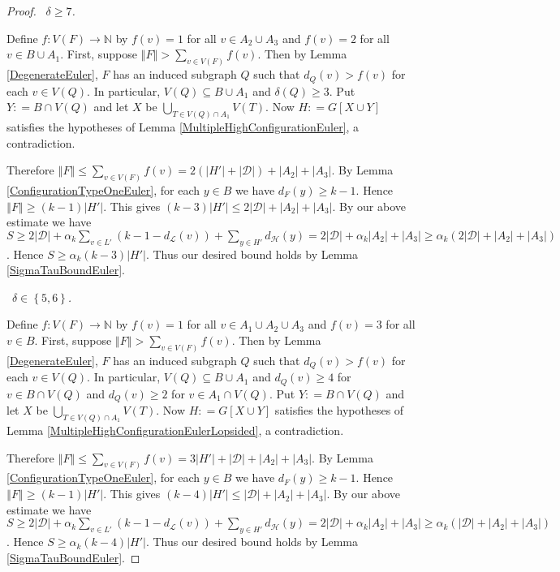 \documentclass[12pt]{article}
\theoremstyle{plain}
\theoremstyle{definition}
\theoremstyle{remark}
\newcommand{\fancy}[1]{\mathcal{#1}}
\newcommand{\IN}{\mathbb{N}}
\newcommand{\D}{\fancy{D}}
\renewcommand{\L}{\fancy{L}}
\newcommand{\HH}{\fancy{H}}
\newcommand{\set}[1]{\left\{ #1 \right\}}
\newcommand{\card}[1]{\left|#1\right|}
\newcommand{\size}[1]{\left\Vert#1\right\Vert}
\newcommand{\func}[3]{#1\colon #2 \rightarrow #3}
\newcommand{\parens}[1]{\left( #1 \right)}
\newcommand{\DefinedAs}{\mathrel{\mathop:}=}
\def\D{\fancy{D}}
\newcommand{\case}[2]{{\bf Case #1.}~{\it #2}~~}
\begin{document}
\begin{proof}
\noindent \case{1}{$\delta \geq 7$.}
\smallskip

Define $\func{f}{V(F)}{\IN}$ by $f(v) = 1$ for all $v \in A_2 \cup A_3$ and $f(v) = 2$ for all $v \in B \cup A_1$.  First, suppose $\size{F} > \sum_{v \in V(F)} f(v)$.  Then by Lemma \ref{DegenerateEuler}, $F$ has an induced subgraph $Q$ such that $d_Q(v) > f(v)$ for each $v \in V(Q)$.  In particular, $V(Q) \subseteq B \cup A_1$ and $\delta(Q) \geq 3$.  Put $Y \DefinedAs B \cap V(Q)$ and let $X$ be $\bigcup_{T \in V(Q) \cap A_1} V(T)$. Now $H \DefinedAs G[X \cup Y]$ satisfies the hypotheses of Lemma \ref{MultipleHighConfigurationEuler}, a contradiction.

Therefore $\size{F} \leq \sum_{v \in V(F)} f(v) = 2(\card{H'} + \card{\D}) + \card{A_2} + 
\card{A_3}$. By Lemma \ref{ConfigurationTypeOneEuler}, for each $y \in B$ we have $d_F(y) \geq k-1$.  Hence $\size{F} \geq (k-1)\card{H'}$.  This gives $(k-3)\card{H'} \leq 2\card{\D} + \card{A_2} + 
\card{A_3}$.  By our above estimate we have $S \geq 2\card{\D} + \alpha_k\sum_{v \in L'} \parens{k-1 - d_{\L}(v)}  + \sum_{y \in H'} d_{\HH}(y) = 2\card{\D} + \alpha_k\card{A_2} + \card{A_3} \geq \alpha_k(2\card{\D} + \card{A_2} + \card{A_3})$.  Hence $S \geq \alpha_k(k-3)\card{H'}$.  Thus our desired bound holds by Lemma \ref{SigmaTauBoundEuler}.
\bigskip

\noindent \case{2}{$\delta \in \set{5,6}$.}
\smallskip

Define $\func{f}{V(F)}{\IN}$ by $f(v) = 1$ for all $v \in A_1 \cup A_2 \cup A_3$ and $f(v) = 3$ for all $v \in B$.  First, suppose $\size{F} > \sum_{v \in V(F)} f(v)$.  Then by Lemma \ref{DegenerateEuler}, $F$ has an induced subgraph $Q$ such that $d_Q(v) > f(v)$ for each $v \in V(Q)$.  In particular, $V(Q) \subseteq B \cup A_1$ and $d_Q(v) \geq 4$ for $v \in B \cap V(Q)$ and $d_Q(v) \geq 2$ for $v \in A_1 \cap V(Q)$.  Put $Y \DefinedAs B \cap V(Q)$ and let $X$ be $\bigcup_{T \in V(Q) \cap A_1} V(T)$. Now $H \DefinedAs G[X \cup Y]$ satisfies the hypotheses of Lemma \ref{MultipleHighConfigurationEulerLopsided}, a contradiction.

Therefore $\size{F} \leq \sum_{v \in V(F)} f(v) = 3\card{H'} + \card{\D} + \card{A_2} + 
\card{A_3}$. By Lemma \ref{ConfigurationTypeOneEuler}, for each $y \in B$ we have $d_F(y) \geq k-1$.  Hence $\size{F} \geq (k-1)\card{H'}$.  This gives $(k-4)\card{H'} \leq \card{\D} + \card{A_2} + 
\card{A_3}$.  By our above estimate we have $S \geq 2\card{\D} + \alpha_k\sum_{v \in L'} \parens{k-1 - d_{\L}(v)}  + \sum_{y \in H'} d_{\HH}(y) = 2\card{\D} + \alpha_k\card{A_2} + \card{A_3} \geq \alpha_k(\card{\D} + \card{A_2} + \card{A_3})$.  Hence $S \geq \alpha_k(k-4)\card{H'}$.  Thus our desired bound holds by Lemma \ref{SigmaTauBoundEuler}.
\end{proof}
\end{document}
